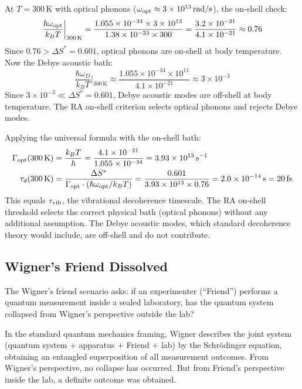 \documentclass[12pt,a4paper]{article}
\begin{document}
At $T=300\,\mathrm{K}$ with optical phonons ($\omega_{\rm opt}\approx3\times10^{13}\,\mathrm{rad/s}$), the on-shell check:
\begin{equation}
  \frac{\hbar\omega_{\rm opt}}{k_BT}\biggr|_{300\,\mathrm{K}} = \frac{1.055\times10^{-34}\times3\times10^{13}}{1.38\times10^{-23}\times300} = \frac{3.2\times10^{-21}}{4.1\times10^{-21}} \approx 0.76
\end{equation}
Since $0.76>\Delta S^*=0.601$, optical phonons are on-shell at body temperature.  Now the Debye acoustic bath:
\begin{equation}
  \frac{\hbar\omega_D}{k_BT}\biggr|_{300\,\mathrm{K}} \approx \frac{1.055\times10^{-34}\times10^{11}}{4.1\times10^{-21}} \approx 3\times10^{-3}
\end{equation}
Since $3\times10^{-3}\ll\Delta S^*=0.601$, Debye acoustic modes are off-shell at body temperature.  The RA on-shell criterion selects optical phonons and rejects Debye modes.

Applying the universal formula with the on-shell bath:
\begin{align}
  \Gamma_{\rm opt}(300\,\mathrm{K}) &= \frac{k_BT}{\hbar} = \frac{4.1\times10^{-21}}{1.055\times10^{-34}} = 3.93\times10^{13}\,\mathrm{s}^{-1} \\
  \tau_d(300\,\mathrm{K}) &= \frac{\Delta S^*}{\Gamma_{\rm opt}\cdot(\hbar\omega_{\rm opt}/k_BT)} = \frac{0.601}{3.93\times10^{13}\times0.76} = 2.0\times10^{-14}\,\mathrm{s} = 20\,\mathrm{fs}
  \label{eq:tau_bio}
\end{align}
This equals $\tau_{\rm vib}$, the vibrational decoherence timescale.  The RA on-shell threshold selects the correct physical bath (optical phonons) without any additional assumption.  The Debye acoustic modes, which standard decoherence theory would include, are off-shell and do not contribute.

\subsection{Wigner's Friend Dissolved}

The Wigner's friend scenario \cite{Wigner1961} asks: if an experimenter (``Friend'') performs a quantum measurement inside a sealed laboratory, has the quantum system collapsed from Wigner's perspective outside the lab?

In the standard quantum mechanics framing, Wigner describes the joint system (quantum system + apparatus + Friend + lab) by the Schr\"odinger equation, obtaining an entangled superposition of all measurement outcomes.  From Wigner's perspective, no collapse has occurred.  But from Friend's perspective inside the lab, a definite outcome was obtained.
\end{document}

